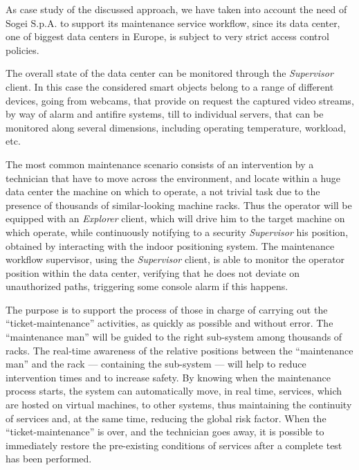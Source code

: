 As case study of the discussed approach, we have taken into account the need of Sogei S.p.A. to support its maintenance service  workflow, since its data center, one of biggest data centers in Europe, is subject to very strict access control policies. 

The overall state of the data center can be monitored through the \emph{Supervisor} client. In this case the considered smart objects belong to a range of different devices, going from webcams, that provide on request the captured video streams, by way of alarm and antifire systems, till to individual servers, that can be monitored along several dimensions, including operating temperature, workload, etc. 

The most common maintenance scenario consists of an intervention by a technician that have to move across the environment, and locate within a huge data center the machine on which to operate, a not trivial task due to the presence of thousands of similar-looking machine racks. Thus the operator will be equipped with an \emph{Explorer} client, which will drive him to the target machine on which operate, while continuously notifying to a security \emph{Supervisor} his position, obtained by interacting with the indoor positioning system.
The maintenance workflow supervisor, using the \emph{Supervisor} client, is able to monitor the operator position within the data center, verifying that he does not deviate on unauthorized paths, triggering some console alarm if this happens.

The purpose is to support  the process of those in charge of carrying out the ``ticket-maintenance'' activities, as quickly  as possible and without error. The ``maintenance man'' will be guided to the right sub-system among thousands of racks. The real-time awareness of the relative positions between the ``maintenance man'' and the rack --- containing the sub-system --- will help to reduce intervention times and to increase safety. By  knowing when the maintenance process starts, the system  can automatically move, in real time, services, which are hosted on virtual machines, to other systems, thus maintaining the continuity of services and, at the same time,  reducing  the global risk factor. When the ``ticket-maint\-enan\-ce'' is over, and the technician goes away, it is possible to immediately  restore  the pre-existing conditions of services after a complete test has been performed.






